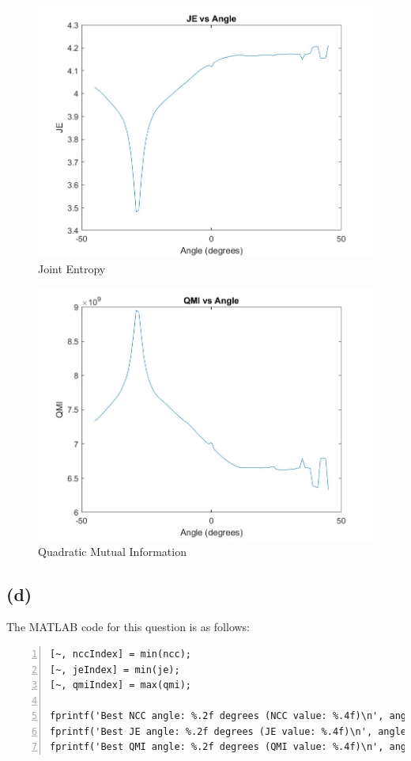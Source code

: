 \documentclass{article}
\begin{document}
\begin{figure}[H]
\centering
\includegraphics[scale=0.3]{JE_vs_Angle.jpg}
\caption{Joint Entropy}
\end{figure}

\begin{figure}[H]
\centering
\includegraphics[scale=0.3]{QMI_vs_Angle.jpg}
\caption{Quadratic Mutual Information}
\end{figure}

\subsection*{(d)}

The MATLAB code for this question is as follows:
\begin{lstlisting}[frame=single,numbers=left,style=Matlab-Pyglike,breaklines=true,postbreak=\mbox{\textcolor{red}{$\hookrightarrow$}\space}]
[~, nccIndex] = min(ncc);
[~, jeIndex] = min(je);
[~, qmiIndex] = max(qmi);

fprintf('Best NCC angle: %.2f degrees (NCC value: %.4f)\n', angles(nccIndex), ncc(nccIndex));
fprintf('Best JE angle: %.2f degrees (JE value: %.4f)\n', angles(jeIndex), je(jeIndex));
fprintf('Best QMI angle: %.2f degrees (QMI value: %.4f)\n', angles(qmiIndex), qmi(qmiIndex));    
\end{lstlisting}
\end{document}

